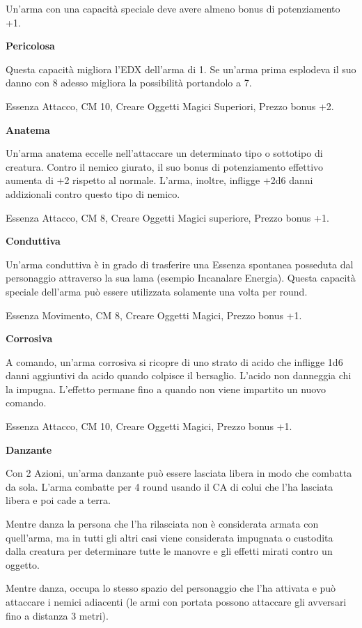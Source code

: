 \documentclass[a4paper,11pt,twoside,openany]{book}
\begin{document}
Un'arma con una capacità speciale deve avere almeno bonus di potenziamento +1.

\textbf{Pericolosa}

Questa capacità migliora l'EDX dell'arma di 1. Se un'arma prima esplodeva il suo danno con 8 adesso migliora la possibilità portandolo a 7.

Essenza Attacco, CM 10, Creare Oggetti Magici Superiori, Prezzo bonus +2.

\textbf{Anatema}

Un'arma anatema eccelle nell'attaccare un determinato tipo o sottotipo di creatura. Contro il nemico giurato, il suo bonus di potenziamento effettivo aumenta di +2 rispetto al normale. L'arma, inoltre, infligge +2d6 danni addizionali contro questo tipo di nemico.

Essenza Attacco, CM 8, Creare Oggetti Magici superiore, Prezzo bonus +1.

\textbf{Conduttiva}

Un'arma conduttiva è in grado di trasferire una Essenza spontanea posseduta dal personaggio attraverso la sua lama (esempio Incanalare Energia). Questa capacità speciale dell'arma può essere utilizzata solamente una volta per round.

Essenza Movimento, CM 8, Creare Oggetti Magici, Prezzo bonus +1.

\textbf{Corrosiva}

A comando, un'arma corrosiva si ricopre di uno strato di acido che infligge 1d6 danni aggiuntivi da acido quando colpisce il bersaglio. L'acido non danneggia chi la impugna. L'effetto permane fino a quando non viene impartito un nuovo comando.

Essenza Attacco, CM 10, Creare Oggetti Magici, Prezzo bonus +1.

\textbf{Danzante}

Con 2 Azioni, un'arma danzante può essere lasciata libera in modo che combatta da sola. L'arma combatte per 4 round usando il CA di colui che l'ha lasciata libera e poi cade a terra.

Mentre danza la persona che l'ha rilasciata non è considerata armata con quell'arma, ma in tutti gli altri casi viene considerata impugnata o custodita dalla creatura per determinare tutte le manovre e gli effetti mirati contro un oggetto.

Mentre danza, occupa lo stesso spazio del personaggio che l'ha attivata e può attaccare i nemici adiacenti (le armi con portata possono attaccare gli avversari fino a distanza 3 metri).
\end{document}

